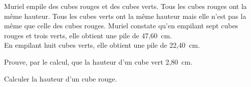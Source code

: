 Muriel empile des cubes rouges et des cubes verts. Tous les cubes
rouges ont la même hauteur. Tous les cubes verts ont la même
hauteur mais elle n'est pas la même que celle des cubes rouges.
Muriel constate qu'en empilant sept cubes rouges et trois verts,
elle obtient une pile de 47,60~cm.\\
En empilant huit cubes verts, elle obtient une pile de 22,40~cm.
\begin{myenumerate}
    \item  Prouve,  par le  calcul,  que  la  hauteur d'un  cube  vert
    2,80~cm. 
    \item Calculer la hauteur d'un cube rouge.
\end{myenumerate}